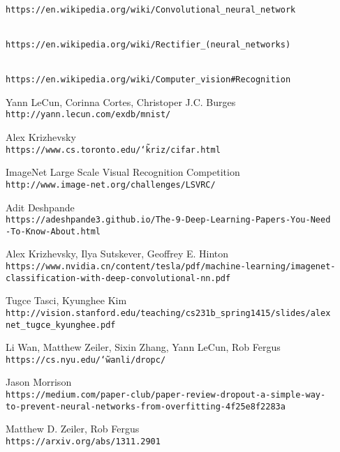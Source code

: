 \begin{thebibliography}{99}
\\\texttt{https://en.wikipedia.org/wiki/Convolutional\_neural\_network}

\\\texttt{https://en.wikipedia.org/wiki/Rectifier\_(neural\_networks)}

\\\texttt{https://en.wikipedia.org/wiki/Computer\_vision\#Recognition}

Yann LeCun, Corinna Cortes, Christoper J.C. Burges
\\\texttt{http://yann.lecun.com/exdb/mnist/}

Alex Krizhevsky
\\\texttt{https://www.cs.toronto.edu/\char`\~kriz/cifar.html}

ImageNet Large Scale Visual Recognition Competition
\\\texttt{http://www.image-net.org/challenges/LSVRC/}

Adit Deshpande
\\\texttt{https://adeshpande3.github.io/The-9-Deep-Learning-Papers-You-Need\\-To-Know-About.html}

Alex Krizhevsky, Ilya Sutskever, Geoffrey E. Hinton
\\\texttt{https://www.nvidia.cn/content/tesla/pdf/machine-learning/imagenet-\\classification-with-deep-convolutional-nn.pdf}

Tugce Tasci, Kyunghee Kim
\\\texttt{http://vision.stanford.edu/teaching/cs231b\_spring1415/slides/alex\\net\_tugce\_kyunghee.pdf}

Li Wan, Matthew Zeiler, Sixin Zhang, Yann LeCun, Rob Fergus
\\\texttt{https://cs.nyu.edu/\char`\~wanli/dropc/}

Jason Morrison
\\\texttt{https://medium.com/paper-club/paper-review-dropout-a-simple-way-\\to-prevent-neural-networks-from-overfitting-4f25e8f2283a}

Matthew D. Zeiler, Rob Fergus
\\\texttt{https://arxiv.org/abs/1311.2901}


\end{thebibliography}

